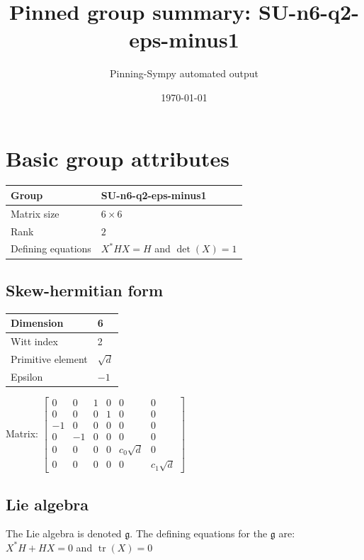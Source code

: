 \documentclass[11pt]{article}
\title{Pinned group summary: SU-n6-q2-eps-minus1}
\author{Pinning-Sympy automated output}
\date{\today}
\newcommand{\frakg}{\mathfrak{g}}
\theoremstyle{definition}
\begin{document}
\maketitle
\tableofcontents

\newpage

\section{Basic group attributes}

\def\arraystretch{1.2}
\begin{tabular}{|l|l|}
	\hline
    Group & SU-n6-q2-eps-minus1 \\
	\hline
    Matrix size & $6 \times 6$ \\
	\hline
    Rank & $2$ \\
	\hline
	Defining equations & $X^*HX=H$ and $\operatorname{det}(X)=1$ \\
	\hline
\end{tabular}
\def\arraystretch{1}

\subsection{Skew-hermitian form}
\begin{tabular}{|l|l|}
    \hline
    Dimension & 6 \\
    \hline
    Witt index & 2 \\
    \hline
    Primitive element & $\sqrt{d}$ \\
    \hline
    Epsilon & $-1$ \\
    \hline
\end{tabular}

\bigskip
\noindent Matrix: \(
\left[\begin{matrix}0 & 0 & 1 & 0 & 0 & 0\\0 & 0 & 0 & 1 & 0 & 0\\-1 & 0 & 0 & 0 & 0 & 0\\0 & -1 & 0 & 0 & 0 & 0\\0 & 0 & 0 & 0 & c_{0} \sqrt{d} & 0\\0 & 0 & 0 & 0 & 0 & c_{1} \sqrt{d}\end{matrix}\right]
\)



\subsection{Lie algebra}

The Lie algebra is denoted $\frakg$. The defining equations for the $\frakg$ are: $X^*H + HX=0$ and $\operatorname{tr}(X)=0$
\end{document}
